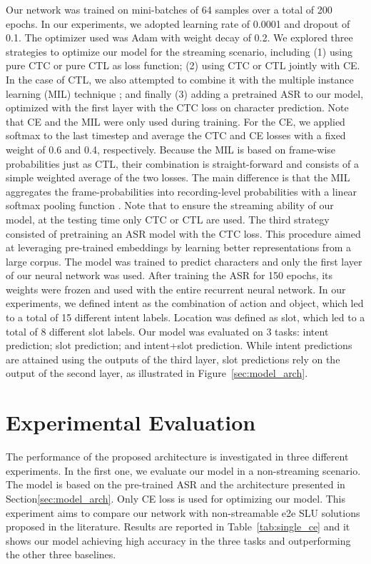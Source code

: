 \documentclass[a4paper]{article}
\begin{document}
Our network was trained on mini-batches of 64 samples over a total of 200 epochs. In our experiments, we adopted learning rate of 0.0001 and dropout of 0.1. The optimizer used was Adam with weight decay of 0.2. We explored three strategies to optimize our model for the streaming scenario, including (1) using pure CTC or pure CTL as loss function; (2) using CTC or CTL jointly with CE. In the case of CTL, we also attempted to combine it with the multiple instance learning (MIL) technique \cite{wang2019connectionist}; and finally (3) adding a pretrained ASR to our model, optimized with the first layer with the CTC loss on character prediction. Note that CE and the MIL were only used during training. For the CE, we applied softmax to the last timestep and average the CTC and CE losses with a fixed weight of 0.6 and 0.4, respectively. Because the MIL is based on frame-wise probabilities just as CTL, their combination is straight-forward and consists of a simple weighted average of the two losses. The main difference is that the MIL aggregates the frame-probabilities into recording-level probabilities with a linear softmax pooling function \cite{wang2019connectionist}. Note that to ensure the streaming ability of our model, at the testing time only CTC or CTL are used. The third strategy consisted of pretraining an ASR model with the CTC loss. This procedure aimed at leveraging pre-trained embeddings by learning better representations from a large corpus. The model was trained to predict characters and only the first layer of our neural network was used. After training the ASR for 150 epochs, its weights were frozen and used with the entire recurrent neural network. In our experiments, we defined intent as the combination of action and object, which led to a total of 15 different intent labels. Location was defined as slot, which led to a total of 8 different slot labels. Our model was evaluated on 3 tasks: intent prediction; slot prediction; and intent+slot prediction. While intent predictions are attained using the outputs of the third layer, slot predictions rely on the output of the second layer, as illustrated in Figure~\ref{sec:model_arch}.  
 
\section{Experimental Evaluation}
\label{sec:results}

The performance of the proposed architecture is investigated in three different experiments. In the first one, we evaluate our model in a non-streaming scenario. The model is based on the pre-trained ASR and the architecture presented in Section\ref{sec:model_arch}. Only CE loss is used for optimizing our model. This experiment aims to compare our network with non-streamable e2e SLU solutions proposed in the literature. Results are reported in Table~\ref{tab:single_ce} and it shows our model achieving high accuracy in the three tasks and outperforming the other three baselines.
\end{document}
